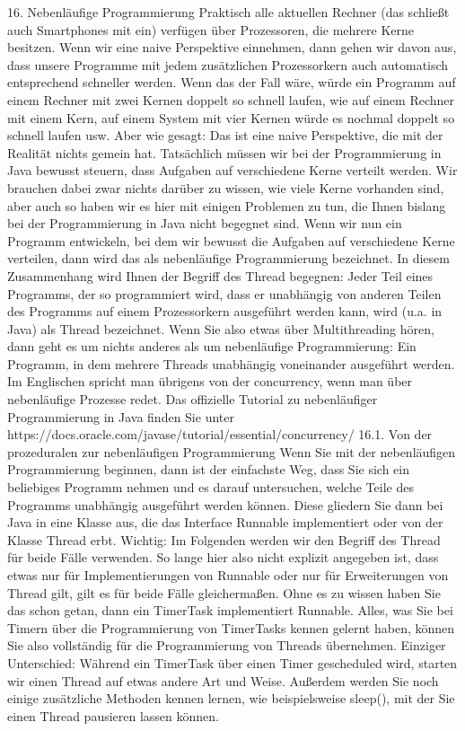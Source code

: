 16.	Nebenläufige Programmierung
Praktisch alle aktuellen Rechner (das schließt auch Smartphones mit ein) verfügen über Prozessoren, die mehrere Kerne besitzen. Wenn wir eine naive Perspektive einnehmen, dann gehen wir davon aus, dass unsere Programme mit jedem zusätzlichen Prozessorkern auch automatisch entsprechend schneller werden. Wenn das der Fall wäre, würde ein Programm auf einem Rechner mit zwei Kernen doppelt so schnell laufen, wie auf einem Rechner mit einem Kern, auf einem System mit vier Kernen würde es nochmal doppelt so schnell laufen usw. Aber wie gesagt: Das ist eine naive Perspektive, die mit der Realität nichts gemein hat.
Tatsächlich müssen wir bei der Programmierung in Java bewusst steuern, dass Aufgaben auf verschiedene Kerne verteilt werden. Wir brauchen dabei zwar nichts darüber zu wissen, wie viele Kerne vorhanden sind, aber auch so haben wir es hier mit einigen Problemen zu tun, die Ihnen bislang bei der Programmierung in Java nicht begegnet sind.
Wenn wir nun ein Programm entwickeln, bei dem wir bewusst die Aufgaben auf verschiedene Kerne verteilen, dann wird das als nebenläufige Programmierung bezeichnet. In diesem Zusammenhang wird Ihnen der Begriff des Thread begegnen: Jeder Teil eines Programms, der so programmiert wird, dass er unabhängig von anderen Teilen des Programms auf einem Prozessorkern ausgeführt werden kann, wird (u.a. in Java) als Thread bezeichnet. Wenn Sie also etwas über Multithreading hören, dann geht es um nichts anderes als um nebenläufige Programmierung: Ein Programm, in dem mehrere Threads unabhängig voneinander ausgeführt werden.
Im Englischen spricht man übrigens von der concurrency, wenn man über nebenläufige Prozesse redet.
Das offizielle Tutorial zu nebenläufiger Programmierung in Java finden Sie unter https://docs.oracle.com/javase/tutorial/essential/concurrency/ 
16.1.	Von der prozeduralen zur nebenläufigen Programmierung
Wenn Sie mit der nebenläufigen Programmierung beginnen, dann ist der einfachste Weg, dass Sie sich ein beliebiges Programm nehmen und es darauf untersuchen, welche Teile des Programms unabhängig ausgeführt werden können. Diese gliedern Sie dann bei Java in eine Klasse aus, die das Interface Runnable implementiert oder von der Klasse Thread erbt. 
Wichtig:
Im Folgenden werden wir den Begriff des Thread für beide Fälle verwenden. So lange hier also nicht explizit angegeben ist, dass etwas nur für Implementierungen von Runnable oder nur für Erweiterungen von Thread gilt, gilt es für beide Fälle gleichermaßen.
Ohne es zu wissen haben Sie das schon getan, dann ein TimerTask implementiert Runnable. Alles, was Sie bei Timern über die Programmierung von TimerTasks kennen gelernt haben, können Sie also vollständig für die Programmierung von Threads übernehmen. Einziger Unterschied: Während ein TimerTask über einen Timer gescheduled wird, starten wir einen Thread auf etwas andere Art und Weise. Außerdem werden Sie noch einige zusätzliche Methoden kennen lernen, wie beispielsweise sleep(), mit der Sie einen Thread pausieren lassen können.
